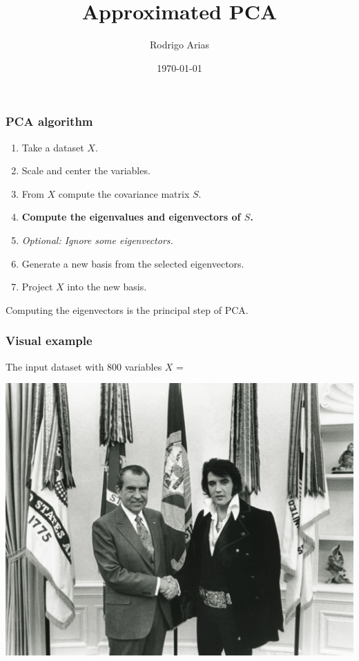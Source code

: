\documentclass[serif, 12pt]{beamer}
\title{Approximated PCA}
\author{Rodrigo Arias} %
\date{\today} %
\begin{document}
\begin{frame}
	\titlepage
\end{frame}


\begin{frame}

\frametitle{PCA algorithm}

\begin{enumerate}
\item Take a dataset $X$.
\item Scale and center the variables.
\item From $X$ compute the covariance matrix $S$.
\item \textbf{Compute the eigenvalues and eigenvectors of $S$.}
\item \textit{Optional: Ignore some eigenvectors.}
\item Generate a new basis from the selected eigenvectors.
\item Project $X$ into the new basis.
\end{enumerate}

\pause

Computing the eigenvectors is the principal step of PCA.

\end{frame}


\begin{frame}

\frametitle{Visual example}
The input dataset with 800 variables $X$ = 

\begin{center}
\includegraphics[width=\textheight]{input}
\end{center}

\end{frame}
\end{document}

